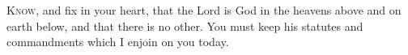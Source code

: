 
\lettrine{K}{now,} and fix in your heart, that the Lord is God in the heavens above and on earth below, and that there is no other. You must keep his statutes and commandments which I enjoin on you today.